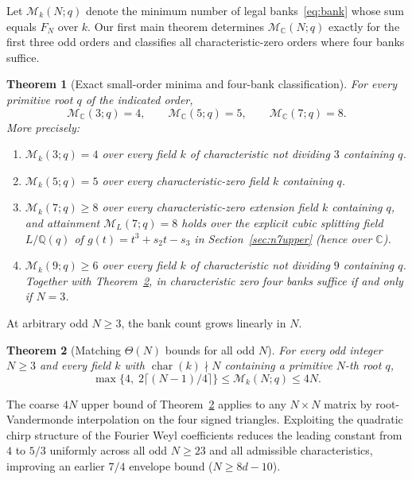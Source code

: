\documentclass[11pt,reqno]{amsart}
\numberwithin{equation}{section}
\newtheorem{theorem}{Theorem}[section]
\theoremstyle{definition}
\theoremstyle{remark}
\newcommand{\C}{\mathbb{C}}
\newcommand{\Q}{\mathbb{Q}}
\newcommand{\M}{\mathcal{M}}
\begin{document}
Let $\M_k(N;q)$ denote the minimum number of legal banks~\eqref{eq:bank} whose sum equals $F_N$ over $k$. Our first main theorem determines $\M_{\C}(N;q)$ exactly for the first three odd orders and classifies all characteristic-zero orders where four banks suffice.

\begin{theorem}[Exact small-order minima and four-bank classification]
\label{thm:small}
For every primitive root $q$ of the indicated order,
\begin{equation}
\label{eq:small-minima}
\M_{\C}(3;q) = 4,\qquad \M_{\C}(5;q) = 5,\qquad \M_{\C}(7;q) = 8.
\end{equation}
More precisely:
\begin{enumerate}[label=(\alph*),leftmargin=2em]
\item $\M_k(3;q)=4$ over every field $k$ of characteristic not dividing $3$ containing $q$.
\item $\M_k(5;q)=5$ over every characteristic-zero field $k$ containing $q$.
\item $\M_k(7;q)\ge 8$ over every characteristic-zero extension field $k$ containing $q$, and attainment $\M_L(7;q)=8$ holds over the explicit cubic splitting field $L/\Q(q)$ of $g(t)=t^3+s_2 t-s_3$ in Section~\ref{sec:n7upper} (hence over $\C$).
\item $\M_k(9;q)\ge 6$ over every field $k$ of characteristic not dividing $9$ containing $q$. Together with Theorem~\ref{thm:linear}, in characteristic zero four banks suffice if and only if $N=3$.
\end{enumerate}
\end{theorem}

At arbitrary odd $N\ge 3$, the bank count grows linearly in $N$.

\begin{theorem}[Matching $\Theta(N)$ bounds for all odd $N$]
\label{thm:linear}
For every odd integer $N\ge 3$ and every field $k$ with $\operatorname{char}(k)\nmid N$ containing a primitive $N$-th root $q$,
\begin{equation}
\label{eq:theta-N}
\max\bigl\{4,\; 2\lceil(N-1)/4\rceil\bigr\} \le \M_k(N;q) \le 4N.
\end{equation}
\end{theorem}

The coarse $4N$ upper bound of Theorem~\ref{thm:linear} applies to any $N\times N$ matrix by root-Vandermonde interpolation on the four signed triangles. Exploiting the quadratic chirp structure of the Fourier Weyl coefficients reduces the leading constant from $4$ to $5/3$ uniformly across all odd $N\ge 23$ and all admissible characteristics, improving an earlier $7/4$ envelope bound ($N\ge 8d-10$).
\end{document}
